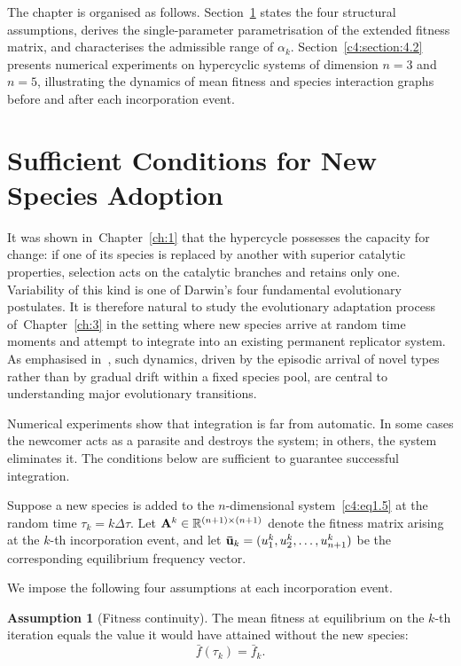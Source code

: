 \documentclass[12pt]{report}
\theoremstyle{definition}
\newtheorem{assumpt}[theorem]{Assumption}
\theoremstyle{remark}
\begin{document}
The chapter is organised as follows. Section~\ref{c4:section:4.1} states the four
structural assumptions, derives the single-parameter parametrisation of the
extended fitness matrix, and characterises the admissible range of $\alpha_k$.
Section~\ref{c4:section:4.2} presents numerical experiments on hypercyclic systems
of dimension $n = 3$ and $n = 5$, illustrating the dynamics of mean fitness
and species interaction graphs before and after each incorporation event.

\section{Sufficient Conditions for New Species Adoption}
\label{c4:section:4.1}

It was shown in~Chapter~\ref{ch:1} that the hypercycle possesses the capacity for
change: if one of its species is replaced by another with superior catalytic
properties, selection acts on the catalytic branches and retains only one.
Variability of this kind is one of Darwin's four fundamental evolutionary
postulates. It is therefore natural to study the evolutionary adaptation process
of~Chapter~\ref{ch:3} in the setting where new species arrive at random time
moments and attempt to integrate into an existing permanent replicator system.
As emphasised in~\cite{c4:Markov2014,c4:Kunin2011}, such dynamics, driven by the
episodic arrival of novel types rather than by gradual drift within a fixed species
pool, are central to understanding major evolutionary transitions.

Numerical experiments show that integration is far from automatic. In some cases
the newcomer acts as a parasite and destroys the system; in others, the system
eliminates it. The conditions below are sufficient to guarantee successful
integration.

Suppose a new species is added to the $n$-dimensional system~\eqref{c4:eq1.5} at
the random time $\tau_k = k\Delta\tau$. Let
${\bf A}^k \in \mathbb{R}^{(n+1)\times(n+1)}$ denote the fitness matrix
arising at the $k$-th incorporation event, and let
${\bf \bar{u}}_k = (u_1^k, u_2^k, \ldots, u_{n+1}^k)$ be the corresponding
equilibrium frequency vector.

We impose the following four assumptions at each incorporation event.

\begin{assumpt}[Fitness continuity]\label{c4:ass:1}
The mean fitness at equilibrium on the $k$-th iteration equals the value it
would have attained without the new species:
\begin{equation}
    \bar{f}(\tau_k) = \bar{f}_k.
    \label{c4:eq4.1}
\end{equation}
\end{assumpt}
\end{document}
